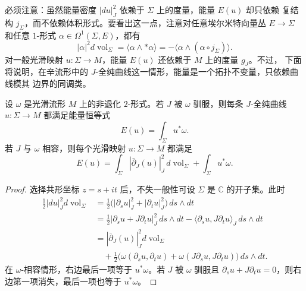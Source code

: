 必须注意：虽然能量密度 $|du|_J^2$ 依赖于 $\Sigma$ 上的度量，能量 $E(u)$ 却只依赖
复结构 $j_\Sigma$，而不依赖体积形式。要看出这一点，注意对任意埃尔米特向量丛
$E\to\Sigma$ 和任意 $1$-形式 $\alpha\in\Omega^1(\Sigma,E)$，都有
\[
  |\alpha|^2d\operatorname{vol}_\Sigma
  =\langle\alpha\wedge *\alpha\rangle
  =-\langle\alpha\wedge(\alpha\circ j_\Sigma)\rangle.
\]
对一般光滑映射 $u:\Sigma\to M$，能量 $E(u)$ 还依赖于 $M$ 上的度量 $g_J$。不过，
下面将说明，在辛流形中的 $J$-全纯曲线这一情形，能量是一个拓扑不变量，只依赖曲线模其
边界的同调类。

\begin{lemma}\label{lem:2-2-1}
设 $\omega$ 是光滑流形 $M$ 上的非退化 $2$-形式。若 $J$ 被 $\omega$ 驯服，则每条
$J$-全纯曲线 $u:\Sigma\to M$ 都满足能量恒等式
\begin{equation}\label{eq:2-2-2}
  E(u)=\int_\Sigma u^*\omega.
\end{equation}
若 $J$ 与 $\omega$ 相容，则每个光滑映射 $u:\Sigma\to M$ 都满足
\begin{equation}\label{eq:2-2-3}
  E(u)=\int_\Sigma|\bar\partial_J(u)|_J^2\,
  d\operatorname{vol}_\Sigma+\int_\Sigma u^*\omega.
\end{equation}
\end{lemma}

\begin{proof}
选择共形坐标 $z=s+it$ 后，不失一般性可设 $\Sigma$ 是 $\mathbb C$ 的开子集。此时
\begin{align*}
  \frac12|du|_J^2d\operatorname{vol}_\Sigma
  &={\frac12}\bigl(|\partial_su|_J^2+|\partial_tu|_J^2\bigr)\,ds\wedge dt\\
  &={\frac12}|\partial_su+J\partial_tu|_J^2\,ds\wedge dt
    -\langle\partial_su,J\partial_tu\rangle_J\,ds\wedge dt\\
  &=|\bar\partial_J(u)|_J^2d\operatorname{vol}_\Sigma\\
  &\quad+{\frac12}\bigl(\omega(\partial_su,\partial_tu)
    +\omega(J\partial_su,J\partial_tu)\bigr)\,ds\wedge dt.
\end{align*}
在 $\omega$-相容情形，右边最后一项等于 $u^*\omega$。若 $J$ 被 $\omega$ 驯服且
$\partial_su+J\partial_tu=0$，则右边第一项消失，最后一项也等于 $u^*\omega$。
\end{proof}

